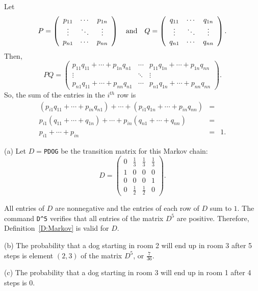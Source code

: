 Let
\[
P = \left(\begin{array}{ccc} p_{11} & \cdots & p_{1n} \\
\vdots & \ddots & \vdots \\ p_{n1} & \cdots & p_{nn}
\end{array}\right) \quad\mbox{and}\quad Q = \left(\begin{array}{ccc} q_{11} &
\cdots & q_{1n} \\ \vdots & \ddots & \vdots \\ q_{n1} & \cdots
& q_{nn} \end{array}\right).
\]
Then,
\[
PQ = \left(\begin{array}{ccc} p_{11}q_{11} + \cdots + p_{1n}q_{n1}
& \cdots & p_{11}q_{1n} + \cdots + p_{1n}q_{nn} \\
\vdots & \ddots & \vdots \\ p_{n1}q_{11} + \cdots + p_{nn}q_{n1}
& \cdots & p_{n1}q_{1n} + \cdots + p_{nn}q_{nn} \end{array}\right).
\]
So, the sum of the entries in the $i^{th}$ row is
\[
\begin{array}{rcl}
(p_{i1}q_{11} + \cdots + p_{in}q_{n1}) + \cdots + (p_{i1}q_{1n} +
\cdots + p_{in}q_{nn}) & = & \\
p_{i1}(q_{11} + \cdots + q_{1n}) + \cdots + p_{in}(q_{n1} +
\cdots + q_{nn}) & = & \\ p_{i1} + \cdots + p_{in} & = & 1.
\end{array}
\]

(a) \ans Let $D =${\tt PDOG} be the transition matrix for this Markov chain:
\[
D = \left(\begin{array}{rrrr} 0 & \frac{1}{3} & \frac{1}{3} &
\frac{1}{3} \\ 1 & 0 & 0 & 0 \\ 0 & 0 & 0 & 1 \\
0 & \frac{1}{2} & \frac{1}{2} & 0 \end{array}\right).
\]

\soln All entries of $D$ are nonnegative and the entries of each row of
$D$ sum to $1$.  The \Matlab command {\tt D\^{}5} verifies that all
entries of the matrix $D^5$ are positive.  Therefore,
Definition~\ref{D:Markov} is valid for $D$.

(b) The probability that a dog starting in room 2 will end up in room
3 after 5 steps is element $(2,3)$ of the matrix $D^5$, or
$\frac{7}{36}$.

(c) \ans The probability that a dog starting in room 3 will end up in room
1 after 4 steps is 0.

